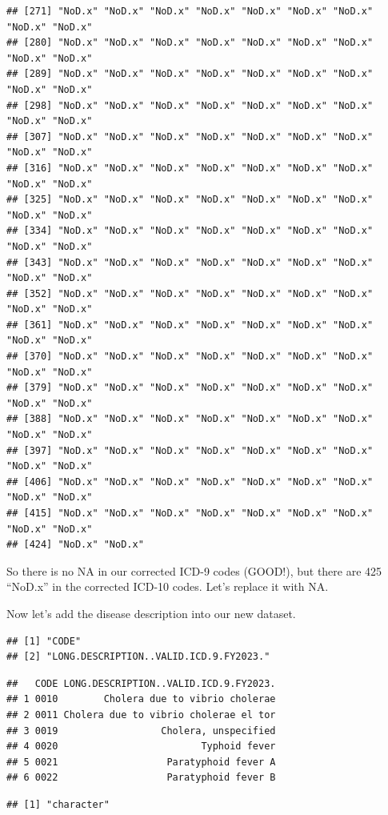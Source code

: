 \documentclass[
]{article}
\begin{document}
\begin{verbatim}
## [271] "NoD.x" "NoD.x" "NoD.x" "NoD.x" "NoD.x" "NoD.x" "NoD.x" "NoD.x" "NoD.x"
## [280] "NoD.x" "NoD.x" "NoD.x" "NoD.x" "NoD.x" "NoD.x" "NoD.x" "NoD.x" "NoD.x"
## [289] "NoD.x" "NoD.x" "NoD.x" "NoD.x" "NoD.x" "NoD.x" "NoD.x" "NoD.x" "NoD.x"
## [298] "NoD.x" "NoD.x" "NoD.x" "NoD.x" "NoD.x" "NoD.x" "NoD.x" "NoD.x" "NoD.x"
## [307] "NoD.x" "NoD.x" "NoD.x" "NoD.x" "NoD.x" "NoD.x" "NoD.x" "NoD.x" "NoD.x"
## [316] "NoD.x" "NoD.x" "NoD.x" "NoD.x" "NoD.x" "NoD.x" "NoD.x" "NoD.x" "NoD.x"
## [325] "NoD.x" "NoD.x" "NoD.x" "NoD.x" "NoD.x" "NoD.x" "NoD.x" "NoD.x" "NoD.x"
## [334] "NoD.x" "NoD.x" "NoD.x" "NoD.x" "NoD.x" "NoD.x" "NoD.x" "NoD.x" "NoD.x"
## [343] "NoD.x" "NoD.x" "NoD.x" "NoD.x" "NoD.x" "NoD.x" "NoD.x" "NoD.x" "NoD.x"
## [352] "NoD.x" "NoD.x" "NoD.x" "NoD.x" "NoD.x" "NoD.x" "NoD.x" "NoD.x" "NoD.x"
## [361] "NoD.x" "NoD.x" "NoD.x" "NoD.x" "NoD.x" "NoD.x" "NoD.x" "NoD.x" "NoD.x"
## [370] "NoD.x" "NoD.x" "NoD.x" "NoD.x" "NoD.x" "NoD.x" "NoD.x" "NoD.x" "NoD.x"
## [379] "NoD.x" "NoD.x" "NoD.x" "NoD.x" "NoD.x" "NoD.x" "NoD.x" "NoD.x" "NoD.x"
## [388] "NoD.x" "NoD.x" "NoD.x" "NoD.x" "NoD.x" "NoD.x" "NoD.x" "NoD.x" "NoD.x"
## [397] "NoD.x" "NoD.x" "NoD.x" "NoD.x" "NoD.x" "NoD.x" "NoD.x" "NoD.x" "NoD.x"
## [406] "NoD.x" "NoD.x" "NoD.x" "NoD.x" "NoD.x" "NoD.x" "NoD.x" "NoD.x" "NoD.x"
## [415] "NoD.x" "NoD.x" "NoD.x" "NoD.x" "NoD.x" "NoD.x" "NoD.x" "NoD.x" "NoD.x"
## [424] "NoD.x" "NoD.x"
\end{verbatim}

So there is no NA in our corrected ICD-9 codes (GOOD!), but there are
425 ``NoD.x'' in the corrected ICD-10 codes. Let's replace it with NA.

Now let's add the disease description into our new dataset.

\begin{verbatim}
## [1] "CODE"                                 
## [2] "LONG.DESCRIPTION..VALID.ICD.9.FY2023."
\end{verbatim}

\begin{verbatim}
##   CODE LONG.DESCRIPTION..VALID.ICD.9.FY2023.
## 1 0010        Cholera due to vibrio cholerae
## 2 0011 Cholera due to vibrio cholerae el tor
## 3 0019                  Cholera, unspecified
## 4 0020                         Typhoid fever
## 5 0021                   Paratyphoid fever A
## 6 0022                   Paratyphoid fever B
\end{verbatim}

\begin{verbatim}
## [1] "character"
\end{verbatim}
\end{document}
